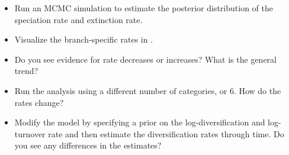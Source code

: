 \begin{itemize}
\item Run an MCMC simulation to estimate the posterior distribution of the speciation rate and extinction rate.
\item Visualize the branch-specific rates in \FigTree.
\item Do you see evidence for rate decreases or increases? What is the general trend?
\item Run the analysis using a different number of categories,  or 6. How do the rates change?
\item Modify the model by specifying a prior on the log-diversification and log-turnover rate and then estimate the diversification rates through time. Do you see any differences in the estimates?
\end{itemize}






